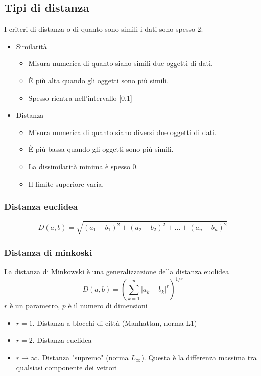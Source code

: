 \subsection{Tipi di distanza}
I criteri di distanza o di quanto sono simili i dati sono spesso 2:
\begin{itemize}
	\item Similarità
	      \begin{itemize}
		      \item Misura numerica di quanto siano simili due oggetti di dati.
		      \item È più alta quando gli oggetti sono più simili.
		      \item Spesso rientra nell'intervallo [0,1]
	      \end{itemize}
	\item Distanza
	      \begin{itemize}
		      \item Misura numerica di quanto siano diversi due oggetti di dati.
		      \item È più bassa quando gli oggetti sono più simili.
		      \item La dissimilarità minima è spesso 0.
		      \item Il limite superiore varia.
	      \end{itemize}
\end{itemize}
\subsubsection{Distanza euclidea}
\begin{center}
\end{center}
\begin{equation*}
	D(a, b) = \sqrt{(a_1-b_1)^2 + (a_2-b_2)^2 + \ldots + (a_n-b_n)^2}
\end{equation*}
\subsubsection{Distanza di minkoski}
La distanza di Minkowski è una generalizzazione della distanza euclidea
\begin{equation*}
	D(a,b) = \left( \sum_{k=1}^{p} |a_k - b_k|^r \right)^{1/r}
\end{equation*}
$r$ è un parametro, $p$ è il numero di dimensioni
\begin{itemize}
	\item $r = 1$. Distanza a blocchi di città (Manhattan, norma L1)
	\item $r = 2$. Distanza euclidea
	\item $r \to \infty$. Distanza "supremo" (norma $L_{\infty}$). Questa è la differenza massima tra qualsiasi componente dei vettori
\end{itemize}

